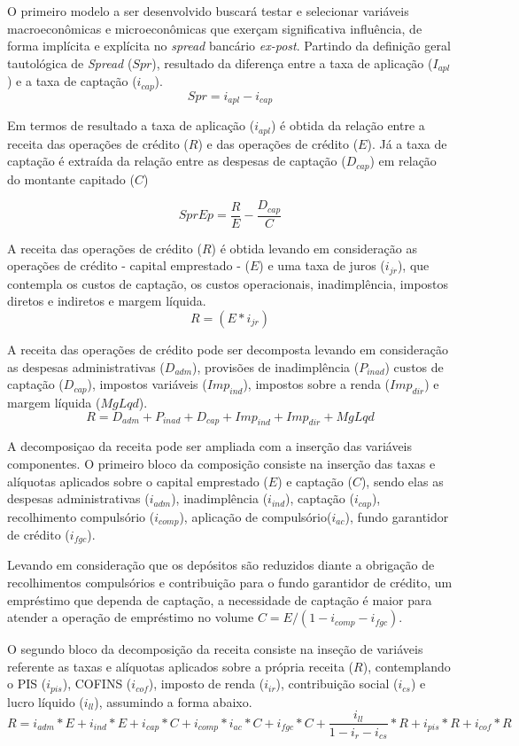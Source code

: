 \documentclass[12pt,12pt,openright,oneside,a4paper,chapter=TITLE,section=TITLE,subsection=TITLE,subsubsection=TITLE,english,french,spanish,portugues,sumario=tradicional]{abntex2}
\begin{document}
O primeiro modelo a ser desenvolvido buscará testar e selecionar variáveis macroeconômicas e microeconômicas que exerçam significativa influência, de forma implícita e explícita no \emph{spread} bancário \emph{ex-post}. Partindo da definição geral tautológica de \emph{Spread} (\(Spr\)), resultado da diferença entre a taxa de aplicação (\(I_{apl}\)) e a taxa de captação (\(i_{cap}\)).
\[
Spr = i_{apl} - i_{cap} 
\]

Em termos de resultado a taxa de aplicação (\(i_{apl}\)) é obtida da relação entre a receita das operações de crédito (\(R\)) e das operações de crédito (\(E\)). Já a taxa de captação é extraída da relação entre as despesas de captação (\(D_{cap}\)) em relação do montante capitado (\(C\))

\[
SprEp = \frac{R}{E} - \frac{D_{cap}}{C}
\]

A receita das operações de crédito (\(R\)) é obtida levando em consideração as operações de crédito - capital emprestado - (\(E\)) e uma taxa de juros (\(i_{jr}\)), que contempla os custos de captação, os custos operacionais, inadimplência, impostos diretos e indiretos e margem líquida.
\[
R= (E * i_{jr}) 
\]

A receita das operações de crédito pode ser decomposta levando em consideração as despesas administrativas (\(D_{adm}\)), provisões de inadimplência (\(P_{inad}\)) custos de captação (\(D_{cap}\)), impostos variáveis (\(Imp_{ind}\)), impostos sobre a renda (\(Imp_{dir}\)) e margem líquida (\(MgLqd\)).
\[
R = D_{adm} + P_{inad} + D_{cap} + Imp_{ind} + Imp_{dir} + MgLqd
\]

A decomposiçao da receita pode ser ampliada com a inserção das variáveis componentes. O primeiro bloco da composição consiste na inserção das taxas e alíquotas aplicados sobre o capital emprestado (\(E\)) e captação (\(C\)), sendo elas as despesas administrativas (\(i_{adm}\)), inadimplência (\(i_{ind}\)), captação (\(i_{cap}\)), recolhimento compulsório (\(i_{comp}\)), aplicação de compulsório(\(i_{ac}\)), fundo garantidor de crédito (\(i_{fgc}\)).

Levando em consideração que os depósitos são reduzidos diante a obrigação de recolhimentos compulsórios e contribuição para o fundo garantidor de crédito, um empréstimo que dependa de captação, a necessidade de captação é maior para atender a operação de empréstimo no volume \(C = E / (1 - i_{comp} - i_{fgc})\).

O segundo bloco da decomposição da receita consiste na inseção de variáveis referente as taxas e alíquotas aplicados sobre a própria receita (\(R\)), contemplando o PIS (\(i_{pis}\)), COFINS (\(i_{cof}\)), imposto de renda (\(i_{ir}\)), contribuição social (\(i_{cs}\)) e lucro líquido (\(i_{ll}\)), assumindo a forma abaixo.
\[
R = i_{adm}*E + i_{ind}*E + i_{cap}*C + i_{comp}*i_{ac}*C + i_{fgc}*C + \frac{i_{ll}}{1 - i_{r} - i_{cs}}*R + i_{pis}*R + i_{cof}*R 
\]
\end{document}
